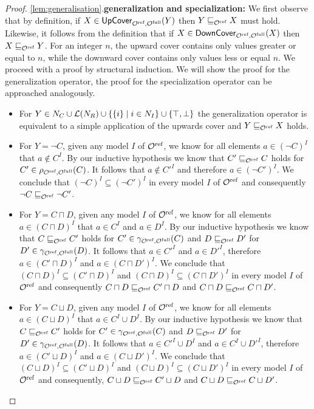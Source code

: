 \begin{proof}
\item \ref{lem:generalisation}.\enspace \textbf{generalization and specialization:\enspace}
We first observe that by definition, if $X \in {\ensuremath{\mathsf{UpCover}}}_{{\mathcal{O}^\textnormal{ref}},{\mathcal{O}^\textnormal{full}}}(Y)$ then $Y \sqsubseteq_{\mathcal{O}^\textnormal{ref}} X$ must hold. Likewise, it follows from the definition that if $X \in {\ensuremath{\mathsf{DownCover}}}_{{\mathcal{O}^\textnormal{ref}},{\mathcal{O}^\textnormal{full}}}(X)$ then $X \sqsubseteq_{\mathcal{O}^\textnormal{ref}} Y$. For an integer $n$, the upward cover contains only values greater or equal to $n$, while the downward cover contains only values less or equal $n$. We proceed with a proof by structural induction. We will show the proof for the generalization operator, the proof for the specialization operator can be approached analogously.
\begin{itemize}
  \item For $Y \in N_C \cup \mathcal{L}(N_R) \cup \{ \{i\} \mid i \in N_I \} \cup \{ \top, \bot \}$ the generalization operator is equivalent to a simple application of the upwards cover and $Y \sqsubseteq_{\mathcal{O}^\textnormal{ref}} X$ holds.
  \item For $Y = \lnot C$, given any model $I$ of ${\mathcal{O}^\textnormal{ref}}$, we know for all elements $a \in (\lnot C)^I$ that $a \not\in C^I$. By our inductive hypothesis we know that $C' \sqsubseteq_{\mathcal{O}^\textnormal{ref}} C$ holds for $C' \in \rho_{{\mathcal{O}^\textnormal{ref}},{\mathcal{O}^\textnormal{full}}}(C)$. It follows that $a \not\in C'^I$ and therefore $a \in (\lnot C')^I$. We conclude that $(\lnot C)^I \subseteq (\lnot C')^I$ in every model $I$ of ${\mathcal{O}^\textnormal{ref}}$ and consequently $\lnot C \sqsubseteq_{\mathcal{O}^\textnormal{ref}} \lnot C'$.
  \item For $Y = C \sqcap D$, given any model $I$ of ${\mathcal{O}^\textnormal{ref}}$, we know for all elements $a \in (C \sqcap D)^I$ that $a \in C^I$ and $a \in D^I$. By our inductive hypothesis we know that $C \sqsubseteq_{\mathcal{O}^\textnormal{ref}} C'$ holds for $C' \in \gamma_{{\mathcal{O}^\textnormal{ref}},{\mathcal{O}^\textnormal{full}}}(C)$ and $D \sqsubseteq_{\mathcal{O}^\textnormal{ref}} D'$ for $D' \in \gamma_{{\mathcal{O}^\textnormal{ref}},{\mathcal{O}^\textnormal{full}}}(D)$. It follows that $a \in C'^I$ and $a \in D'^I$, therefore $a \in (C' \sqcap D)^I$ and $a \in (C \sqcap D')^I$. We conclude that $(C \sqcap D)^I \subseteq (C' \sqcap D)^I$ and $(C \sqcap D)^I \subseteq (C \sqcap D')^I$ in every model $I$ of ${\mathcal{O}^\textnormal{ref}}$ and consequently $C \sqcap D \sqsubseteq_{\mathcal{O}^\textnormal{ref}} C' \sqcap D$ and $C \sqcap D \sqsubseteq_{\mathcal{O}^\textnormal{ref}} C \sqcap D'$.
  \item For $Y = C \sqcup D$, given any model $I$ of ${\mathcal{O}^\textnormal{ref}}$, we know for all elements $a \in (C \sqcup D)^I$ that $a \in C^I \cup D^I$. By our inductive hypothesis we know that $C \sqsubseteq_{\mathcal{O}^\textnormal{ref}} C'$ holds for $C' \in \gamma_{{\mathcal{O}^\textnormal{ref}},{\mathcal{O}^\textnormal{full}}}(C)$ and $D \sqsubseteq_{\mathcal{O}^\textnormal{ref}} D'$ for $D' \in \gamma_{{\mathcal{O}^\textnormal{ref}},{\mathcal{O}^\textnormal{full}}}(D)$. It follows that $a \in C'^I \cup D^I$ and $a \in C^I \cup D'^I$, therefore $a \in (C' \sqcup D)^I$ and $a \in (C \sqcup D')^I$. We conclude that $(C \sqcup D)^I \subseteq (C' \sqcup D)^I$ and $(C \sqcup D)^I \subseteq (C \sqcup D')^I$ in every model $I$ of ${\mathcal{O}^\textnormal{ref}}$ and consequently, $C \sqcup D \sqsubseteq_{\mathcal{O}^\textnormal{ref}} C' \sqcup D$ and $C \sqcup D \sqsubseteq_{\mathcal{O}^\textnormal{ref}} C \sqcup D'$.

\end{itemize}
\end{proof}
